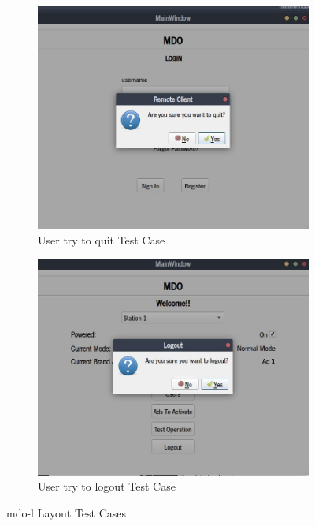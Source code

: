 \begin{figure}[htb!]
  \centering
  \begin{subfigure}{.45\textwidth}
    \includegraphics[width=\textwidth]{img/rc-quit-test.jpg}%
  \caption{User try to quit Test Case}%
  \label{fig:rc-quit-test}
  \end{subfigure}
  \begin{subfigure}{.45\textwidth}
    \includegraphics[width=\textwidth]{img/rc-logout-test.jpg}%
  \caption{User try to logout Test Case}%
  \label{fig:rc-logout-test}
  \end{subfigure}
  \caption{\gls{mdo-l} Layout Test Cases}%
  \label{fig:rc-layout-test}
\end{figure}

